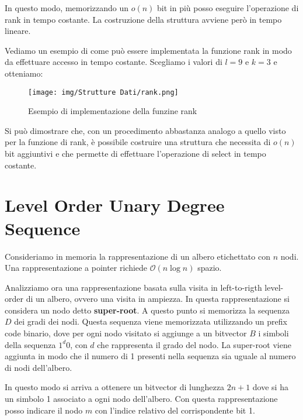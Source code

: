 In questo modo, memorizzando un $o(n)$ bit in più posso eseguire l'operazione di
rank in tempo costante. La costruzione della struttura avviene però in tempo lineare.
\begin{esempio}
    Vediamo un esempio di come può essere implementata la funzione rank in modo
    da effettuare accesso in tempo costante. Scegliamo i valori di $l = 9$ e $k = 3$ e otteniamo:
    \begin{figure}[!ht]
        \centering
        \texttt{[image: img/Strutture Dati/rank.png]}
        \caption{Esempio di implementazione della funzine rank}
    \end{figure}
\end{esempio}
\begin{osservazione}
    Si può dimostrare che, con un procedimento abbastanza analogo a quello visto
    per la funzione di rank, è possibile costruire una struttura che necessita di
    $o(n)$ bit aggiuntivi e che permette di effettuare l'operazione di select in
    tempo costante.
\end{osservazione}
\section{Level Order Unary Degree Sequence}
Consideriamo in memoria la rappresentazione di un albero etichettato con $n$ nodi.
Una rappresentazione a pointer richiede $\mathcal{O}(n \log n)$ spazio.

Analizziamo ora una rappresentazione basata sulla visita in left-to-rigth level-order
di un albero, ovvero una visita in ampiezza. In questa rappresentazione si considera
un nodo detto \textbf{super-root}. A questo punto si memorizza la sequenza $D$ dei
gradi dei nodi. Questa sequenza viene memorizzata utilizzando un prefix code binario,
dove per ogni nodo visitato si aggiunge a un bitvector $B$ i simboli della sequenza
$1^d0$, con $d$ che rappresenta il grado del nodo. La super-root viene aggiunta in
modo che il numero di 1 presenti nella sequenza sia uguale al numero di nodi dell'albero.

In questo modo si arriva a ottenere un bitvector di lunghezza $2n + 1$ dove si
ha un simbolo 1 associato a ogni nodo dell'albero. Con questa rappresentazione
posso indicare il nodo $m$ con l'indice relativo del corrispondente bit 1.

